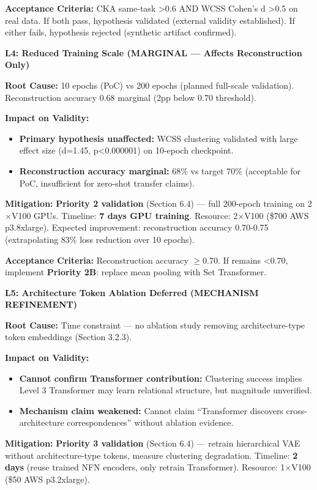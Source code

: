 \textbf{Acceptance Criteria:} CKA same-task >0.6 AND WCSS Cohen's d >0.5 on real data. If both pass, hypothesis validated (external validity established). If either fails, hypothesis rejected (synthetic artifact confirmed).

\textbf{L4: Reduced Training Scale (MARGINAL --- Affects Reconstruction Only)}

\textbf{Root Cause:} 10 epochs (PoC) vs 200 epochs (planned full-scale validation). Reconstruction accuracy 0.68 marginal (2pp below 0.70 threshold).

\textbf{Impact on Validity:}
\begin{itemize}
\item \textbf{Primary hypothesis unaffected:} WCSS clustering validated with large effect size (d=1.45, p<0.000001) on 10-epoch checkpoint.
\item \textbf{Reconstruction accuracy marginal:} 68\% vs target 70\% (acceptable for PoC, insufficient for zero-shot transfer claims).
\end{itemize}

\textbf{Mitigation:} \textbf{Priority 2 validation} (Section 6.4) --- full 200-epoch training on 2$\times$V100 GPUs. Timeline: \textbf{7 days GPU training}. Resource: 2$\times$V100 (\$700 AWS p3.8xlarge). Expected improvement: reconstruction accuracy 0.70-0.75 (extrapolating 83\% loss reduction over 10 epochs).

\textbf{Acceptance Criteria:} Reconstruction accuracy $\geq$0.70. If remains <0.70, implement \textbf{Priority 2B}: replace mean pooling with Set Transformer.

\textbf{L5: Architecture Token Ablation Deferred (MECHANISM REFINEMENT)}

\textbf{Root Cause:} Time constraint --- no ablation study removing architecture-type token embeddings (Section 3.2.3).

\textbf{Impact on Validity:}
\begin{itemize}
\item \textbf{Cannot confirm Transformer contribution:} Clustering success implies Level 3 Transformer may learn relational structure, but magnitude unverified.
\item \textbf{Mechanism claim weakened:} Cannot claim ``Transformer discovers cross-architecture correspondences'' without ablation evidence.
\end{itemize}

\textbf{Mitigation:} \textbf{Priority 3 validation} (Section 6.4) --- retrain hierarchical VAE without architecture-type tokens, measure clustering degradation. Timeline: \textbf{2 days} (reuse trained NFN encoders, only retrain Transformer). Resource: 1$\times$V100 (\$50 AWS p3.2xlarge).

